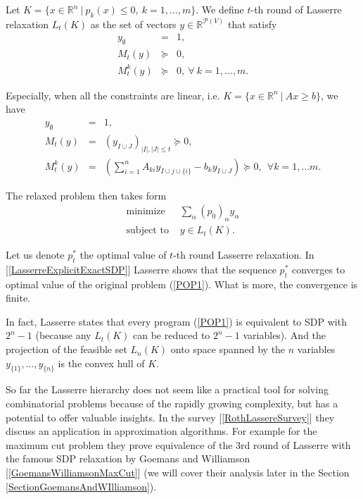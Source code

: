\documentclass[12pt]{book}
\theoremstyle{definition}
\begin{document}
  Let $K = \{ x\in \mathbb{R}^n \ \vert \ p_k(x)\leq 0, \ k=1,\dots ,m \}$. We define $t$-th round of Lasserre relaxation $L_t(K)$ as the set of vectors $y\in \mathbb{R}^{\mathcal{P}(V)}$ that satisfy
\begin{equation}
\begin{array}{rcl}
y_\emptyset &=& 1, \\
M_t(y)  &\succeq & 0, \\
M_t^k(y)  &\succeq & 0 , \ \forall \ k=1,\dots ,m.
\end{array}
\end{equation}

Especially, when all the constraints are linear, i.e. $K = \{ x\in \mathbb{R}^n \ \vert \ Ax\geq b \}$, we have
\begin{equation}
\begin{array}{rcl}
y_\emptyset &=& 1,\\
M_t(y) &=& (y_{I\cup J})_{\vert I\vert ,\vert J\vert \leq t}\succeq 0,  \\
M_t^k(y) &=& \left(\sum_{i=1}^n A_{ki}y_{I\cup j\cup \{i\}} - b_ky_{I\cup J} \right) \succeq 0, \ \ \forall k=1,\dots m.
\end{array}
\end{equation}

The relaxed problem then takes form 
\begin{equation}
\label{LasserreRelax}
\begin{array}{ll}
\mbox{minimize } & \sum_\alpha (p_0)_\alpha y_\alpha \\
\mbox{subject to } & y\in L_t(K).
\end{array}
\end{equation}

Let us denote $p^*_t$ the optimal value of $t$-th round Lasserre relaxation. In [\ref{LasserreExplicitExactSDP}] Lasserre shows that the sequence $p^*_t$ converges to optimal value of the original problem (\ref{POP1}). 
What is more, the convergence is finite. %

In fact, Lasserre states that every program (\ref{POP1}) is equivalent to SDP  with $2^n-1$ (because any $L_t(K)$ can be reduced to $2^n-1$ variables). And the projection of the feasible set $L_n(K)$ onto space spanned by the $n$ variables $y_{\{1\}}, \dots ,y_{\{n\}}$ is the convex hull of $K$.

So far the Lasserre hierarchy does not seem like a practical tool for solving combinatorial problems because of the rapidly growing complexity, but has a potential to offer valuable insights. In the survey [\ref{RothLassereSurvey}] they discuss an application in approximation algorithms. For example for the maximum cut problem they prove equivalence of the 3rd round of Lasserre with the famous SDP relaxation by Goemans and Williamson [\ref{GoemansWilliamsonMaxCut}] (we will cover their analysis later in the Section \ref{SectionGoemansAndWIlliamson}).
\end{document}

